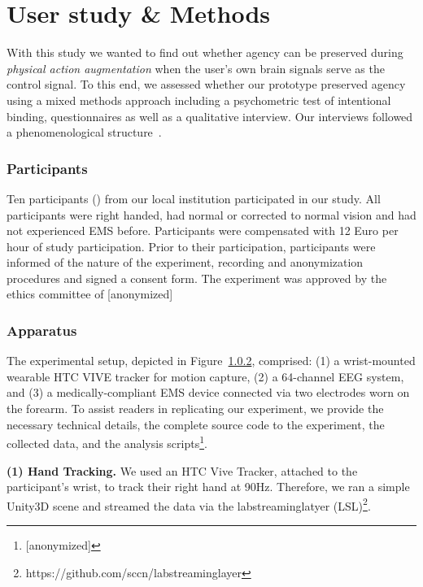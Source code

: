 
\section{User study \& Methods}
With this study we wanted to find out whether agency can be preserved during \textit{physical action augmentation} when the user's own brain signals serve as the control signal. To this end, we assessed whether our prototype preserved agency using a mixed methods approach including a psychometric test of intentional binding, questionnaires as well as a qualitative interview. Our interviews followed a phenomenological structure~\citep{Danry2022-xk}.

\subsubsection{Participants}
 Ten participants () from our local institution participated in our study. All participants were right handed, had normal or corrected to normal vision and had not experienced EMS before. Participants were compensated with 12 Euro per hour of study participation. Prior to their participation, participants were informed of the nature of the experiment, recording and anonymization procedures and signed a consent form. The experiment was approved by the ethics committee of [anonymized]


\subsubsection{Apparatus}
The experimental setup, depicted in Figure~\ref{}, comprised: (1) a wrist-mounted wearable HTC VIVE tracker for motion capture, (2) a 64-channel EEG system, and (3) a medically-compliant EMS device connected via two electrodes worn on the forearm. To assist readers in replicating our experiment, we provide the necessary technical details, the complete source code to the experiment, the collected data, and the analysis scripts\footnote{[anonymized]}.

\indent\textbf{(1) Hand Tracking.} We used an HTC Vive Tracker, attached to the participant's wrist, to track their right hand at 90Hz. Therefore, we ran a simple Unity3D scene and streamed the data via the labstreaminglatyer (LSL)\footnote{https://github.com/sccn/labstreaminglayer}.

